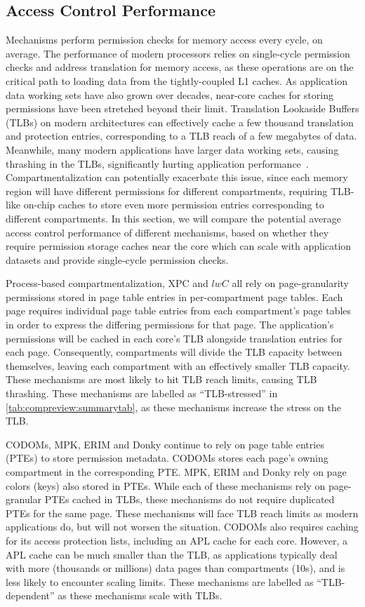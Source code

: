 \subsection{Access Control Performance}
Mechanisms perform permission checks for memory access every cycle,
on average.
The performance of modern processors relies on single-cycle permission
checks and address translation for memory access, as these operations
are on the critical path to loading data from the tightly-coupled L1 caches.
As application data working sets have also grown over decades, near-core
caches for storing permissions have been stretched beyond their limit.
Translation Lookaside Buffers (TLBs) on modern architectures can effectively
cache a few thousand translation and protection entries, corresponding to
a TLB reach of a few megabytes of data.
Meanwhile, many modern applications have larger data working sets, causing
thrashing in the TLBs, significantly hurting application 
performance~\cite{0003BOBFP21midgard}.
Compartmentalization can potentially exacerbate this issue, since each
memory region will have different permissions for different compartments,
requiring TLB-like on-chip caches to store even more permission entries
corresponding to different compartments.
In this section, we will compare the potential average access control
performance of different mechanisms, based on whether they require 
permission storage caches near the core which can scale with application
datasets and provide single-cycle permission checks.

Process-based compartmentalization, XPC and $lwC$ all rely on 
page-granularity permissions stored in page table entries in 
per-compartment page tables. 
Each page requires individual page table entries from each compartment's 
page tables in order to express the differing permissions for that page.
The application's permissions will be cached in each core's TLB alongside
translation entries for each page.
Consequently, compartments will divide the TLB capacity between themselves,
leaving each compartment with an effectively smaller TLB capacity.
These mechanisms are most likely to hit TLB reach limits, causing TLB
thrashing.
These mechanisms are labelled as ``TLB-stressed'' in 
\autoref{tab:compreview:summarytab}, as these mechanisms increase the
stress on the TLB.

CODOMs, MPK, ERIM and Donky continue to rely on page table entries (PTEs) 
to store permission metadata.
CODOMs stores each page's owning compartment in the corresponding PTE.
MPK, ERIM and Donky rely on page colors (keys) also stored in PTEs.
While each of these mechanisms rely on page-granular PTEs cached in
TLBs, these mechanisms do not require duplicated PTEs for the same page.
These mechanisms will face TLB reach limits as modern applications do,
but will not worsen the situation.
CODOMs also requires caching for its access protection lists, including
an APL cache for each core.
However, a APL cache can be much smaller than the TLB, as applications
typically deal with more (thousands or millions) data pages than
compartments (10s), and is less likely to encounter scaling limits.
These mechanisms are labelled as ``TLB-dependent'' as these mechanisms
scale with TLBs.

